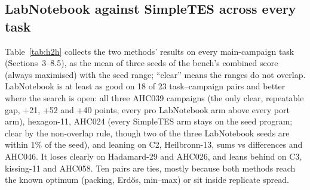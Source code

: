 \subsection{LabNotebook against SimpleTES across every task}
\label{sec:headtohead}

Table~\ref{tab:h2h} collects the two methods' results on every main-campaign task (Sections~3--8.5),
as the mean of three seeds of the bench's combined score (always maximised) with the seed range;
``clear'' means the ranges do not overlap. LabNotebook is at least as good on 18 of 23
task--campaign pairs and better where the search is open: all three AHC039 campaigns (the only clear,
repeatable gap, +21, +52 and +40 points, every pro LabNotebook arm above every port arm), hexagon-11,
AHC024 (every SimpleTES arm stays on the seed program; clear by the non-overlap rule, though two of the
three LabNotebook seeds are within 1\% of the seed), and leaning on C2, Heilbronn-13, sums vs
differences and AHC046. It loses clearly on Hadamard-29 and
AHC026, and leans behind on C3, kissing-11 and AHC058. Ten pairs are ties,
mostly because both methods reach the known optimum (packing, Erd\H{o}s, min--max) or sit inside
replicate spread.

